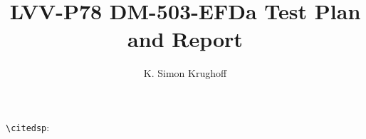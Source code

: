 \documentclass[DM,lsstdraft,toc]{lsstdoc}
\begin{document}
\def\milestoneName{DM-503-EFDa}
\def\milestoneId{LVV-P78}
\def\product{Data Management}


\title{LVV-P78 DM-503-EFDa Test Plan and Report}
\setDocRef{\lsstDocType-\lsstDocNum}
\date{\vcsdate}
\author{K. Simon Krughoff}




\verb|\citedsp|: 


\end{document}
